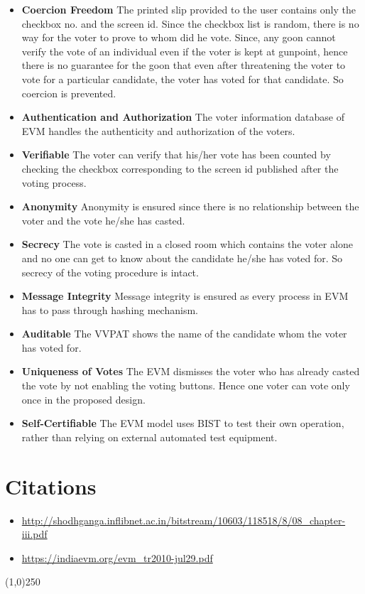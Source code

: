 \documentclass[11pt]{article}
\begin{document}
    \begin{itemize}
    \item \textbf{Coercion Freedom} The printed slip provided to the user contains only the checkbox no. and the screen id. Since the checkbox list is random, there is no way for the voter to prove to whom did he vote. Since, any goon cannot verify the vote of an individual even if the voter is kept at gunpoint, hence there is no guarantee for the goon that even after threatening the voter to vote for a particular candidate, the voter has voted for that candidate. So coercion is prevented.
    \item \textbf{Authentication and Authorization} The voter information database of EVM handles the authenticity and authorization of the voters.
    \item \textbf{Verifiable} The voter can verify that his/her vote has been counted by checking the checkbox corresponding to the screen id published after the voting process.
    \item \textbf{Anonymity} Anonymity is ensured since there is no relationship between the voter and the vote he/she has casted.
    \item \textbf{Secrecy} The vote is casted in a closed room which contains the voter alone and no one can get to know about the candidate he/she has voted for. So secrecy of the voting procedure is intact.
    \item \textbf{Message Integrity} Message integrity is ensured as every process in EVM has to pass through hashing mechanism.
    \item \textbf{Auditable} The VVPAT shows the name of the candidate whom the voter has voted for.
    \item \textbf{Uniqueness of Votes} The EVM dismisses the voter who has already casted the vote by not enabling the voting buttons. Hence one voter can vote only once in the proposed design.
    \item \textbf{Self-Certifiable} The EVM model uses BIST to test their own operation, rather than relying on external automated test equipment.

    \end{itemize}
    

    \section{Citations}
    \begin{itemize}
        \item \url{http://shodhganga.inflibnet.ac.in/bitstream/10603/118518/8/08_chapter-iii.pdf}
        \item \url{https://indiaevm.org/evm_tr2010-jul29.pdf}    
    \end{itemize}
    \begin{center}
    \line(1,0){250}
    \end{center}
\end{document}
